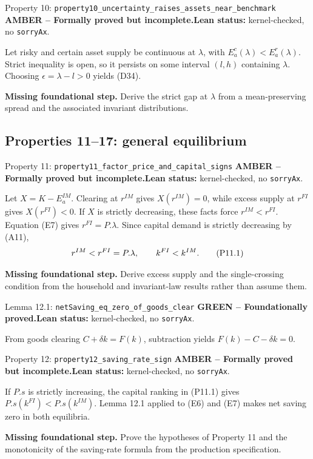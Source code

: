 \documentclass[11pt]{article}
\newcommand{\leanname}[1]{\nolinkurl{#1}}
\newcommand{\eqP}[1]{\refstepcounter{equation}\tag{P#1}}
\newcommand{\formalcheck}{\textbf{Lean status:} kernel-checked, no \texttt{sorryAx}.}
\newcommand{\missing}[1]{\par\smallskip\textbf{Missing foundational step.} #1}
\newcommand{\greenstatus}{\textcolor{proved}{\textbf{GREEN -- Foundationally proved.}}}
\newcommand{\amberstatus}{\textcolor{conditional}{\textbf{AMBER -- Formally proved but incomplete.}}}
\begin{document}
\begin{amberbox}{Property 10: \leanname{property10_uncertainty_raises_assets_near_benchmark}}
\amberstatus\quad\formalcheck

Let risky and certain asset supply be continuous at \(\lambda\), with
\(E_a^c(\lambda)<E_a^r(\lambda)\).  Strict inequality is open, so it persists
on some interval \((l,h)\) containing \(\lambda\).  Choosing
\(\epsilon=\lambda-l>0\) yields (D34).

\missing{Derive the strict gap at \(\lambda\) from a mean-preserving spread
and the associated invariant distributions.}
\end{amberbox}

\subsection{Properties 11--17: general equilibrium}

\begin{amberbox}{Property 11: \leanname{property11_factor_price_and_capital_signs}}
\amberstatus\quad\formalcheck

Let \(X=K-E_a^{IM}\).  Clearing at \(r^{IM}\) gives \(X(r^{IM})=0\), while
excess supply at \(r^{FI}\) gives \(X(r^{FI})<0\).  If \(X\) is strictly
decreasing, these facts force \(r^{IM}<r^{FI}\).  Equation (E7) gives
\(r^{FI}=P.\lambda\).  Since capital demand is strictly decreasing by (A11),
\begin{equation}
 r^{IM}<r^{FI}=P.\lambda,\qquad k^{FI}<k^{IM}. \eqP{11.1}\label{P11.1}
\end{equation}

\missing{Derive excess supply and the single-crossing condition from the
household and invariant-law results rather than assume them.}
\end{amberbox}

\begin{greenbox}{Lemma 12.1: \leanname{netSaving_eq_zero_of_goods_clear}}
\greenstatus\quad\formalcheck

From goods clearing \(C+\delta k=F(k)\), subtraction yields
\(F(k)-C-\delta k=0\).
\end{greenbox}

\begin{amberbox}{Property 12: \leanname{property12_saving_rate_sign}}
\amberstatus\quad\formalcheck

If \(P.s\) is strictly increasing, the capital ranking in (P11.1) gives
\(P.s(k^{FI})<P.s(k^{IM})\).  Lemma 12.1 applied to (E6) and (E7) makes net
saving zero in both equilibria.

\missing{Prove the hypotheses of Property 11 and the monotonicity of the
saving-rate formula from the production specification.}
\end{amberbox}
\end{document}
